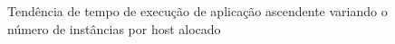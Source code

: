 \documentclass[twoside,english,brazilian]{UNISINOSartigo}
\begin{document}
\begin{itemize}
\begin{figure}
\vspace{-0.5\baselineskip}
\\
\vspace{-0.5\baselineskip}
\\
\caption{Tendência de tempo de execução de aplicação ascendente variando o número de instâncias por host alocado}
\label{fig:trend_asc}
\end{figure}



\end{itemize}
\end{document}
